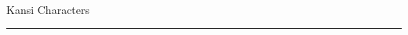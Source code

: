 \documentclass{ctexart}
\begin{document}
\newpage
\begin{center}
    {\fontsize{48}{60}\bfseries\color{primary}}\LARGE\\
\end{center}
\begin{center}
    {\fontsize{48}{60}\bfseries\color{primary}}\LARGE\\
\end{center}
\begin{center}
    {\fontsize{48}{60}\bfseries\color{primary}}\LARGE\\
\end{center}
\begin{center}
    {\Huge\textserif{}Kansi Characters}
\end{center}
\hrule{}
\vspace{1cm}
\end{document}
